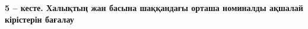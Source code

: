 {\bfseries 5 -- кесте. Халықтың жан басына шаққандағы орташа номиналды
ақшалай кірістерін бағалау}

% 
% 
